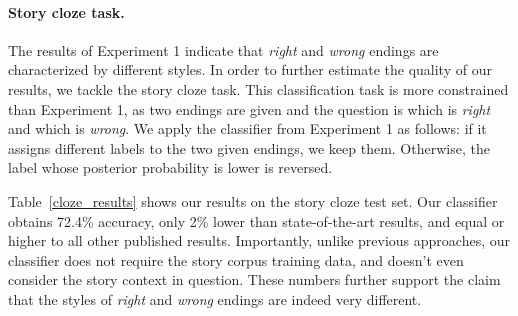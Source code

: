 \documentclass[11pt,a4paper]{article}
\newcommand{\tabref}[1]{Table~\ref{#1}}
\newcommand{\com}[1]{}
\newcommand{\resolved}[1]{}
\newcommand{\shortv}[1]{}
\newcommand{\roy}[1]{{\color{orange}\textsc{[#1 --rs]}}}
\newcommand{\nascomment}[1]{{\color{blue}\textsc{[#1 --nas]}}}
\renewcommand{\roy}[1]{{\color{orange}[#1 --rs]}}
\renewcommand{\roy}[1]{#1}
\renewcommand{\nascomment}[1]{}
\begin{document}
\paragraph{Story cloze task.}
The results of Experiment 1 indicate that {\it right} and {\it wrong} endings are characterized by different styles.
In order to further estimate the quality of our \shortv{classification }results, we tackle the story cloze task\shortv{ using our classifier}.
This classification task is more constrained than Experiment 1, as two
endings are given and the question is which is \emph{right} and which is
\emph{wrong}.
We apply the classifier from Experiment 1 as follows:
if it assigns different labels to the two given endings, we keep
them.  Otherwise, the label whose posterior probability is lower is reversed.

\tabref{cloze_results} shows our results on the story cloze test
set. Our classifier obtains 72.4\% accuracy, \roy{only 2\% lower than state-of-the-art results, and equal or higher to all other published results}\com{12.5\% (absolute) higher than the
published state-of-the-art result on the task \cite{Salle:2016}}\resolved{\nascomment{cite that here}}.
Importantly, unlike previous approaches, our classifier does not require the story corpus training data, and \shortv{in fact }doesn't even consider the \shortv{first four sentences of the }story context in question.
These numbers further support the claim that the styles of {\it right} and {\it wrong} endings are indeed very different.

 \resolved{\nascomment{I suppressed the sentences about the LSDSem shared task;
  once, in the earlier footnote, is enough.}}
\end{document}
